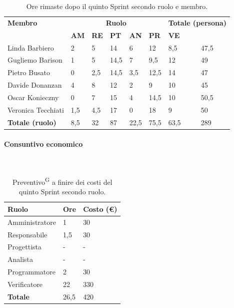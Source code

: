 \documentclass[8pt]{article}
\newcommand{\glossterm}[1]{#1\textsuperscript{G}} %
\newcommand{\subsubsubsection}[1]{\paragraph{#1}\mbox{}\\}
\begin{document}
\begin{table}[ht!]
	\centering
	\begin{tabular}{p{3cm} p{1.4cm} p{1.6cm} p{1.5cm} p{1.5cm} p{1.5cm} p{1.5cm} p{2cm}}
		\toprule
        \textbf{Membro} & \multicolumn{5}{c}{\textbf{Ruolo}} & \multicolumn{2}{r}{\textbf{Totale (persona)}}\\
		& \textbf{AM} & \textbf{RE} & \textbf{PT} & \textbf{AN} & \textbf{PR} & \textbf{VE}\\
		\midrule
        Linda Barbiero     & 2    & 5   & 14   & 6   & 12   & 8,5 & 47,5 \\
        Gugliemo Barison   & 1    & 5   & 14,5 & 7   & 9,5  & 12  & 49 \\
        Pietro Busato      & 0   & 2,5 & 14,5 & 3,5 & 12,5 & 14  & 47 \\
        Davide Donanzan    & 4    & 8   & 12   & 2   & 9    & 10  & 45 \\
        Oscar Konieczny    & 0 & 7   & 15   & 4   & 14,5 & 10  & 50,5 \\
        Veronica Tecchiati & 1,5  & 4,5 & 17   & 0   & 18   & 9   & 50 \\
        \midrule
        \textbf{Totale (ruolo)} & 8,5 & 32 & 87 & 22,5 & 75,5 & 63,5 & 289 \\
		\bottomrule
	\end{tabular}
	\caption{Ore rimaste dopo il quinto Sprint secondo ruolo e membro.}
	\label{table:Ore rimaste dopo il quinto Sprint secondo ruolo e membro.}
\end{table}
\subsubsubsection{Consuntivo economico}
\begin{table}[ht!]
    \centering
    \begin{tabular}{p{4cm} p{1.8cm} p{2.2cm}}
        \toprule
        \textbf{Ruolo} & \textbf{Ore} & \textbf{Costo (€)} \\
        \midrule
        Amministratore & 1 & 30 \\
        Responsabile & 1,5  & 30 \\
        Progettista & -  & - \\
        Analista & - & - \\
        Programmatore & 2 & 30 \\
        Verificatore & 22 & 330 \\
        \bottomrule
        \textbf{Totale} & 26,5 & 420
    \end{tabular}
    \caption{\glossterm{Preventivo} a finire dei costi del quinto Sprint secondo ruolo.}
    \label{table:Preventivo a finire dei costi del quinto Sprint secondo ruolo}
\end{table}
\end{document}
